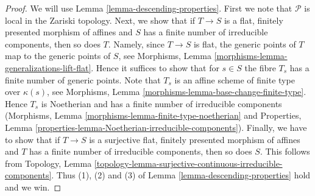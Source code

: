 \documentclass{stacks-project}
\theoremstyle{plain}
\theoremstyle{definition}
\theoremstyle{remark}
\numberwithin{equation}{subsection}
\begin{document}
\begin{proof}
We will use Lemma \ref{lemma-descending-properties}. First we note that
$\mathcal{P}$ is local in the Zariski topology.
Next, we show that if $T \to S$ is a flat, finitely presented
morphism of affines and $S$ has a finite number of irreducible
components, then so does $T$. Namely, since $T \to S$ is flat,
the generic points of $T$ map to the generic points of $S$, see
Morphisms, Lemma \ref{morphisms-lemma-generalizations-lift-flat}.
Hence it suffices to show that for $s \in S$ the fibre $T_s$
has a finite number of generic points. Note that $T_s$ is an
affine scheme of finite type over $\kappa(s)$, see
Morphisms, Lemma \ref{morphisms-lemma-base-change-finite-type}.
Hence $T_s$ is Noetherian and has a finite number of irreducible components
(Morphisms, Lemma \ref{morphisms-lemma-finite-type-noetherian} and
Properties, Lemma \ref{properties-lemma-Noetherian-irreducible-components}).
Finally, we have to show that if $T \to S$ is a surjective flat,
finitely presented morphism of affines and $T$ has a finite number of
irreducible components, then so does $S$. This follows from Topology, Lemma
\ref{topology-lemma-surjective-continuous-irreducible-components}.
Thus (1), (2) and (3) of Lemma \ref{lemma-descending-properties} hold
and we win.
\end{proof}
\end{document}
